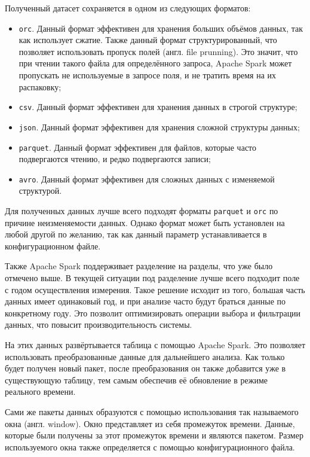 Полученный датасет сохраняется в одном из следующих форматов:
\begin{itemize}
    \item \texttt{orc}. Данный формат эффективен для хранения больших объёмов данных, так как использует сжатие. Также данный формат структурированный, что позволяет использовать пропуск полей (англ. file prunning). Это значит, что при чтении такого файла для определённого запроса, Apache Spark может пропускать не используемые в запросе поля, и не тратить время на их распаковку;
    \item \texttt{csv}. Данный формат эффективен для хранения данных в строгой структуре;
    \item \texttt{json}. Данный формат эффективен для хранения сложной структуры данных;
    \item \texttt{parquet}. Данный формат эффективен для файлов, которые часто подвергаются чтению, и редко подвергаются записи;
    \item \texttt{avro}. Данный формат эффективен для сложных данных с изменяемой структурой.
\end{itemize}

Для полученных данных лучше всего подходят форматы \texttt{parquet} и \texttt{orc} по причине неизменяемости данных.
Однако формат может быть установлен на любой другой по желанию, так как данный параметр устанавливается в конфигурационном файле.

Также Apache Spark поддерживает разделение на разделы, что уже было отмечено выше.
В текущей ситуации под разделение лучше всего подходит поле с годом осуществления измерения.
Такое решение исходит из того, большая часть данных имеет одинаковый год, и при анализе часто будут браться данные по конкретному году.
Это позволит оптимизировать операции выбора и фильтрации данных, что повысит производительность системы.

На этих данных развёртывается таблица с помощью Apache Spark.
Это позволяет использовать преобразованные данные для дальнейшего анализа.
Как только будет получен новый пакет, после преобразования он также добавится уже в существующую таблицу, тем самым обеспечив её обновление в режиме реального времени.

Сами же пакеты данных образуются с помощью использования так называемого окна (англ. window).
Окно представляет из себя промежуток времени.
Данные, которые были получены за этот промежуток времени и являются пакетом.
Размер используемого окна также определяется с помощью конфигурационного файла.

